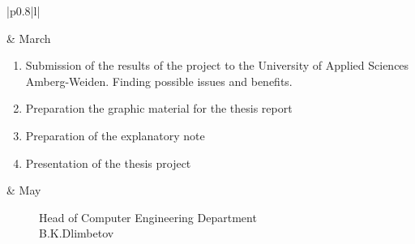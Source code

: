 \documentclass[12pt]{article}
\begin{document}
\begin{centering}
\begin{longtable}{|p{0.8\textwidth}|l|}
\begin{enumerate}
			\end{enumerate}
			& March \\
			\hline
			\begin{enumerate}
				\item Submission of the results of the project to the University of Applied Sciences Amberg-Weiden. Finding possible issues and benefits.
				\item Preparation the graphic material for the thesis report
				\item Preparation of the explanatory note
				\item Presentation of the thesis project
			\end{enumerate}
			& May \\
			\hline
		\end{longtable}
	\end{centering}
	\begin{figure}[ht]
		\begin{minipage}[t]{0.5\linewidth}
			Head of Computer Engineering Department\\ 
			B.K.Dlimbetov\\
		\end{minipage}
	\end{figure}
\end{document}
